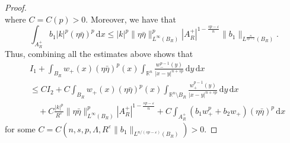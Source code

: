 \documentclass[11pt]{amsart}
\theoremstyle{plain}
\theoremstyle{definition}
\numberwithin{equation}{section}
\begin{document}
\begin{proof}
\begin{equation*}
\end{equation*}
where $C=C(p)>0$. Moreover, we have that
\begin{equation*}
\int_{A^+_R} b_1 |k|^p (\eta\bar{\eta})^p \,\mathrm{d}x \leq |k|^p \|\eta\bar{\eta}\|_{L^\infty(B_R)}^p |A^+_R|^{1-\frac{sp-\varepsilon}{n}} \|b_1\|_{L^{\frac{n}{sp-\varepsilon}}(B_R)}.
\end{equation*}
Thus, combining all the estimates above shows that
\begin{equation}\label{eq-DG1}
\begin{split}
&I_1 + \int_{B_R} w_+(x) (\eta \bar{\eta})^p(x) \int_{\mathbb{R}^n} \frac{w_-^{p-1}(y)}{|x-y|^{n+sp}} \,\mathrm{d}y \,\mathrm{d}x \\
&\leq CI_2 + C\int_{B_R} w_+(x)(\eta\bar{\eta})^p(x) \int_{\mathbb{R}^n \setminus B_R} \frac{w_+^{p-1}(y)}{|x-y|^{n+sp}} \,\mathrm{d}y \,\mathrm{d}x \\
&\quad + C\frac{|k|^p}{R^{\varepsilon}} \|\eta\bar{\eta}\|_{L^\infty(B_R)}^p |A^+_R|^{1-\frac{sp-\varepsilon}{n}} + C\int_{A^+_R} (b_1 w_+^{p} + b_2 w_+)(\eta\bar{\eta})^p \,\mathrm{d}x
\end{split}
\end{equation}
for some $C=C(n, s, p, \Lambda, R^\varepsilon \|b_1\|_{L^{n/(sp-\varepsilon)}(B_R)})>0$.


\end{proof}
\end{document}
